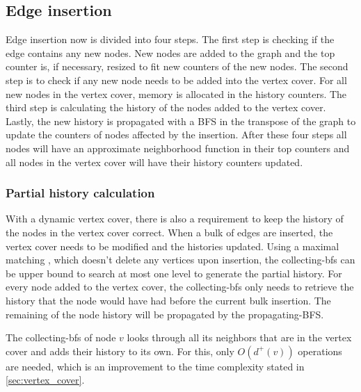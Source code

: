 \subsection{Edge insertion}

Edge insertion now is divided into four steps. The first step is checking if the edge contains any new nodes. New nodes are added to the graph and the top counter is, if necessary, resized to fit new counters of the new nodes. The second step is to check if any new node needs to be added into the vertex cover. For all new nodes in the vertex cover, memory is allocated in the history counters. The third step is calculating the history of the nodes added to the vertex cover. Lastly, the new history is propagated with a BFS in the transpose of the graph to update the counters of nodes affected by the insertion. After these four steps all nodes will have an approximate neighborhood function in their top counters and all nodes in the vertex cover will have their history counters updated. 

\subsubsection{Partial history calculation}
With a dynamic vertex cover, there is also a requirement to keep the history of the nodes in the vertex cover correct. When a bulk of edges are inserted, the vertex cover needs to be modified and the histories updated. Using a maximal matching \cite{2appdynvc}, which doesn't delete any vertices upon insertion, the collecting-bfs can be upper bound to search at most one level to generate the partial history. For every node added to the vertex cover, the collecting-bfs only needs to retrieve the history that the node would have had before the current bulk insertion. The remaining of the node history will be propagated by the propagating-BFS.

The collecting-bfs of node $v$ looks through all its neighbors that are in the vertex cover and adds their history to its own. For this, only $O(d^+(v))$ operations are needed, which is an improvement to the time complexity stated in \ref{sec:vertex_cover}. \\

